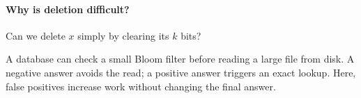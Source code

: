 \documentclass[11pt]{article}
\begin{document}
\paragraph{Why is deletion difficult?}
Can we delete $x$ simply by clearing its $k$ bits?
\vs{.8cm}

\vfill
A database can check a small Bloom filter before reading a large file from
disk. A negative answer avoids the read; a positive answer triggers an exact
lookup. Here, false positives increase work without changing the final answer.

\end{document}
